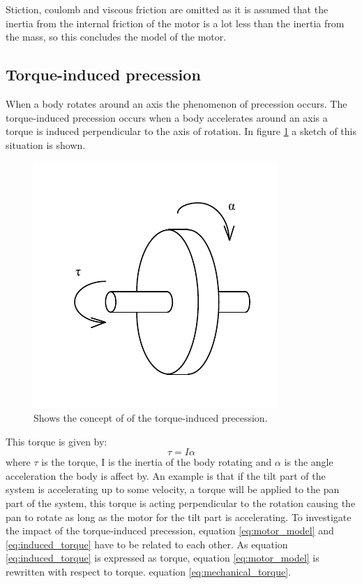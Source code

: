 Stiction, coulomb and viscous friction are omitted as it is assumed that the inertia from the internal friction of the motor is a lot less than the inertia from the mass, so this concludes the model of the motor.


  
\subsection{Torque-induced precession}
When a body rotates around an axis the phenomenon of precession occurs. The torque-induced precession occurs when a body accelerates around an axis a torque is induced perpendicular to the axis of rotation. In figure \ref{fig:precession} a sketch of this situation is shown.
\begin{figure}[htb]
	\begin{center}
	\includegraphics[scale=1,trim=0 0 0 0]{graphics/precession.pdf} %
	\caption{Shows the concept of of the torque-induced precession.}
	\label{fig:precession}			%
	\end{center}
\end{figure}
This torque is given by:
\begin{equation}
	\tau = I\alpha\label{eq:induced_torque}
\end{equation}
where $\tau$ is the torque, I is the inertia of the body rotating and $\alpha$ is the angle acceleration the body is affect by. An example is that if the tilt part of the system is accelerating up to some velocity, a torque will be applied to the pan part of the system, this torque is acting perpendicular to the rotation causing the pan to rotate as long as the motor for the tilt part is accelerating. To investigate the impact of the torque-induced precession, equation \ref{eq:motor_model} and \ref{eq:induced_torque} have to be related to each other. As equation \ref{eq:induced_torque} is expressed as torque, equation \ref{eq:motor_model} is rewritten with respect to torque. equation \ref{eq:mechanical_torque}.
